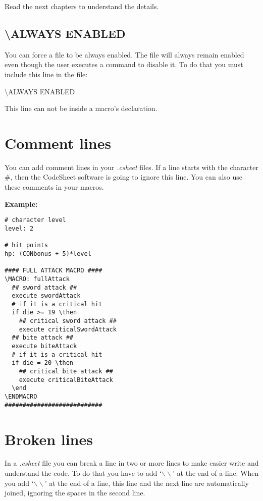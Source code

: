 \documentclass[11pt,a4paper,openright,oneside]{book}
\newenvironment{ex}
{
  \setlength{\parindent}{0cm}
  \large \textbf{Example:} \normalsize 
}
{}
\begin{document}
Read the next chapters to understand the details.

\subsection{\small \textsf{\textbackslash ALWAYS ENABLED}}

You can force a file to be always enabled. The file will always remain enabled even though the user executes a command to disable it. To do that you must include this line in the file:
\begin{center} \textsf{\textbackslash ALWAYS ENABLED} \end{center}

This line can not be inside a macro's declaration.


\section{Comment lines}

You can add comment lines in your \textit{.csheet} files. If a line starts with the character \textsf{\#}, then the CodeSheet software is going to ignore this line. You can also use these comments in your macros.

\begin{ex}
  \begin{lstlisting}
# character level
level: 2

# hit points
hp: (CONbonus + 5)*level

#### FULL ATTACK MACRO ####
\MACRO: fullAttack
  ## sword attack ##
  execute swordAttack
  # if it is a critical hit
  if die >= 19 \then
    ## critical sword attack ##
    execute criticalSwordAttack
  ## bite attack ##
  execute biteAttack
  # if it is a critical hit
  if die = 20 \then
    ## critical bite attack ##
    execute criticalBiteAttack
  \end
\ENDMACRO
###########################
  \end{lstlisting}
\end{ex}

\section{Broken lines}

In a \textit{.csheet} file you can break a line in two or more lines to make easier write and understand the code. To do that you have to add `$\backslash\backslash$' at the end of a line. When you add `$\backslash\backslash$' at the end of a line, this line and the next line are automatically joined, ignoring the spaces in the second line.
\end{document}

